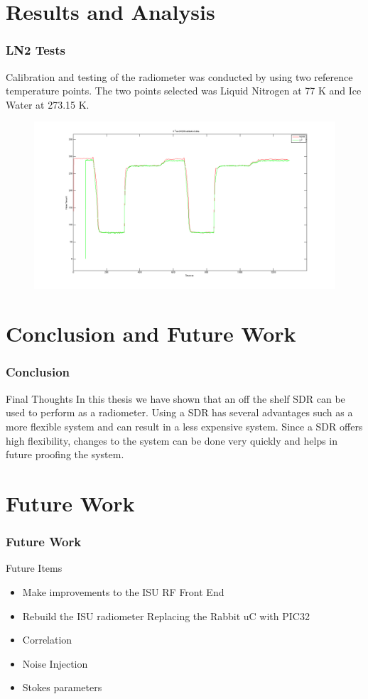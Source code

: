 \documentclass{beamer}
\begin{document}

\section{Results and Analysis}
\begin{frame}
\frametitle{LN2 Tests}
Calibration and testing of the radiometer was conducted by using two reference temperature points.  The two points selected was Liquid Nitrogen at 77 K and Ice Water at 273.15 K. 

\begin{figure}\label{money_shot}
\includegraphics[width=1.0\linewidth]{images/lab1_both_calib.png}
\end{figure} 
\end{frame}
\section{Conclusion and Future Work}
\begin{frame}
\frametitle{Conclusion}
\begin{block}{Final Thoughts}
In this thesis we have shown that an off the shelf SDR can be used to perform as a radiometer.  Using a SDR has several advantages such as a more flexible system and can result in a less expensive system.  Since a SDR offers high flexibility, changes to the system can be done very quickly and helps in future proofing the system.  
\end{block}
\end{frame}
\section{Future Work}
\begin{frame}
\frametitle{Future Work}
\begin{block}{Future Items}
\begin{itemize}
\item Make improvements to the ISU RF Front End
\item Rebuild the ISU radiometer
\note Replacing the Rabbit uC with PIC32
\item Correlation
\item Noise Injection
\item Stokes parameters
\end{itemize}
\end{block}
\end{frame}
\end{document}
